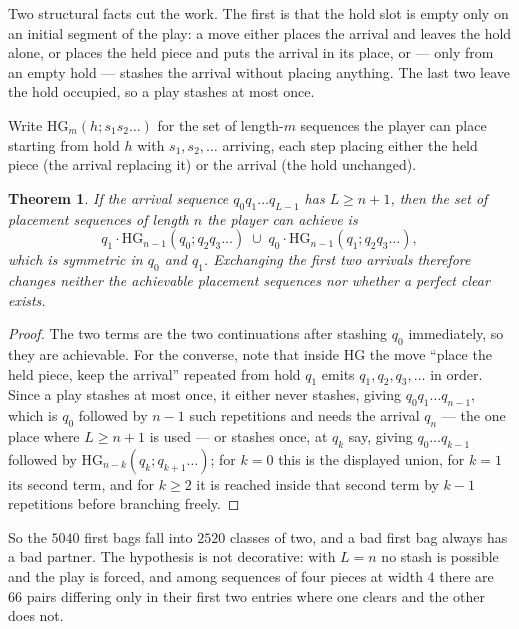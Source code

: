 \documentclass[11pt,a4paper]{article}
\theoremstyle{plain}
\newtheorem{theorem}{Theorem}
\theoremstyle{definition}
\theoremstyle{remark}
\begin{document}
Two structural facts cut the work. The first is that the hold slot is empty only on an
initial segment of the play: a move either places the arrival and leaves the hold
alone, or places the held piece and puts the arrival in its place, or --- only from an
empty hold --- stashes the arrival without placing anything. The last two leave the
hold occupied, so a play stashes at most once.

Write $\mathrm{HG}_m(h; s_1 s_2 \ldots)$ for the set of length-$m$ sequences the player
can place starting from hold $h$ with $s_1, s_2, \ldots$ arriving, each step placing
either the held piece (the arrival replacing it) or the arrival (the hold unchanged).

\begin{theorem}
\label{thm:swap}
If the arrival sequence $q_0 q_1 \ldots q_{L-1}$ has $L \geq n+1$, then the set of
placement sequences of length $n$ the player can achieve is
\[
q_1 \cdot \mathrm{HG}_{n-1}(q_0; q_2 q_3 \ldots) \;\cup\; q_0 \cdot \mathrm{HG}_{n-1}(q_1; q_2 q_3 \ldots),
\]
which is symmetric in $q_0$ and $q_1$. Exchanging the first two arrivals therefore
changes neither the achievable placement sequences nor whether a perfect clear exists.
\end{theorem}

\begin{proof}
The two terms are the two continuations after stashing $q_0$ immediately, so they are
achievable. For the converse, note that inside $\mathrm{HG}$ the move ``place the held
piece, keep the arrival'' repeated from hold $q_1$ emits $q_1, q_2, q_3, \ldots$ in
order. Since a play stashes at most once, it either never stashes, giving
$q_0 q_1 \ldots q_{n-1}$, which is $q_0$ followed by $n-1$ such repetitions and needs
the arrival $q_n$ --- the one place where $L \geq n+1$ is used --- or stashes once, at
$q_k$ say, giving $q_0 \ldots q_{k-1}$ followed by $\mathrm{HG}_{n-k}(q_k; q_{k+1}
\ldots)$; for $k = 0$ this is the displayed union, for $k = 1$ its second term, and for
$k \geq 2$ it is reached inside that second term by $k-1$ repetitions before branching
freely.
\end{proof}

So the $5040$ first bags fall into $2520$ classes of two, and a bad first bag always has
a bad partner. The hypothesis is not decorative: with $L = n$ no stash is possible and
the play is forced, and among sequences of four pieces at width $4$ there are $66$ pairs
differing only in their first two entries where one clears and the other does not.
\end{document}
